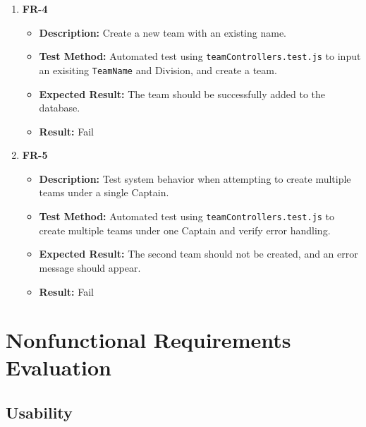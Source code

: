 \documentclass[12pt, titlepage]{article}
\begin{document}
\begin{enumerate}
    \item \textbf{FR-4}  
    \begin{itemize}
        \item \textbf{Description:} Create a new team with an existing name.
        \item \textbf{Test Method:} Automated test using \texttt{teamControllers.test.js} to input an exisiting \texttt{TeamName} and Division, and create a team.
        \item \textbf{Expected Result:} The team should be successfully added to the database.
        \item \textbf{Result:} Fail
    \end{itemize}
    \item \textbf{FR-5}  
    \begin{itemize}
        \item \textbf{Description:} Test system behavior when attempting to create multiple teams under a single Captain.
        \item \textbf{Test Method:} Automated test using \texttt{teamControllers.test.js} to create multiple teams under one Captain and verify error handling.
        \item \textbf{Expected Result:} The second team should not be created, and an error message should appear.
        \item \textbf{Result:} Fail 
    \end{itemize}
\end{enumerate}

\section{Nonfunctional Requirements Evaluation}

\subsection{Usability}
\end{document}
